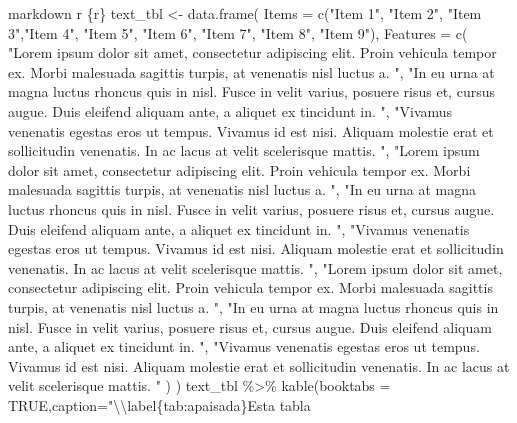 \documentclass[11pt,a4paper,oneside,]{article}
\newenvironment{Shaded}{\begin{snugshade}}{\end{snugshade}}
\newcommand{\AttributeTok}[1]{\textcolor[rgb]{0.77,0.63,0.00}{#1}}
\newcommand{\NormalTok}[1]{#1}
\newcommand{\SpecialCharTok}[1]{\textcolor[rgb]{0.00,0.00,0.00}{#1}}
\newcommand{\StringTok}[1]{\textcolor[rgb]{0.31,0.60,0.02}{#1}}
\numberwithin{dummy}{section}
\theoremstyle{ocrenumbox}
\theoremstyle{blacknumex}
\theoremstyle{blacknumbox}
\theoremstyle{ocrenum}
\theoremstyle{ocrenum}
\begin{document}
\begin{Shaded}
\begin{Highlighting}[numbers=left,,]
\StringTok{\textasciigrave{}\textasciigrave{}\textasciigrave{}\textasciigrave{}}\NormalTok{markdown}
\StringTok{\textasciigrave{}}\AttributeTok{r \textquotesingle{}\textquotesingle{}}\StringTok{\textasciigrave{}\textasciigrave{}\textasciigrave{}\textasciigrave{}}\AttributeTok{\{r\}}
\AttributeTok{text\_tbl \textless{}{-} data.frame(}
\AttributeTok{  Items = c("Item 1", "Item 2", "Item 3","Item 4", "Item 5", "Item 6",}
\AttributeTok{    "Item 7", "Item 8", "Item 9"), }
\AttributeTok{  Features = c(}
\AttributeTok{    "Lorem ipsum dolor sit amet, consectetur adipiscing elit.}
\AttributeTok{    Proin vehicula tempor ex. Morbi malesuada sagittis turpis,}
\AttributeTok{    at venenatis nisl luctus a. ",}
\AttributeTok{    "In eu urna at magna luctus rhoncus quis in nisl. Fusce in velit}
\AttributeTok{    varius, posuere risus et, cursus augue. Duis eleifend aliquam ante,}
\AttributeTok{    a aliquet ex tincidunt in. ",}
\AttributeTok{    "Vivamus venenatis egestas eros ut tempus. Vivamus id est nisi.}
\AttributeTok{    Aliquam molestie erat et sollicitudin venenatis. In ac lacus at}
\AttributeTok{    velit scelerisque mattis. ",}
\AttributeTok{    "Lorem ipsum dolor sit amet, consectetur adipiscing elit.}
\AttributeTok{    Proin vehicula tempor ex. Morbi malesuada sagittis turpis,}
\AttributeTok{    at venenatis nisl luctus a. ",}
\AttributeTok{    "In eu urna at magna luctus rhoncus quis in nisl. Fusce in velit}
\AttributeTok{    varius, posuere risus et, cursus augue. Duis eleifend aliquam ante,}
\AttributeTok{    a aliquet ex tincidunt in. ",}
\AttributeTok{    "Vivamus venenatis egestas eros ut tempus. Vivamus id est nisi.}
\AttributeTok{    Aliquam molestie erat et sollicitudin venenatis. In ac lacus at}
\AttributeTok{    velit scelerisque mattis. ",}
\AttributeTok{    "Lorem ipsum dolor sit amet, consectetur adipiscing elit.}
\AttributeTok{    Proin vehicula tempor ex. Morbi malesuada sagittis turpis,}
\AttributeTok{    at venenatis nisl luctus a. ",}
\AttributeTok{    "In eu urna at magna luctus rhoncus quis in nisl. Fusce in velit}
\AttributeTok{    varius, posuere risus et, cursus augue. Duis eleifend aliquam ante,}
\AttributeTok{    a aliquet ex tincidunt in. ",}
\AttributeTok{    "Vivamus venenatis egestas eros ut tempus. Vivamus id est nisi.}
\AttributeTok{    Aliquam molestie erat et sollicitudin venenatis. In ac lacus at}
\AttributeTok{    velit scelerisque mattis. "}
\AttributeTok{    ) }
\AttributeTok{  )}
\AttributeTok{text\_tbl \%\textgreater{}\%}
\AttributeTok{  kable(booktabs = TRUE,caption="}\SpecialCharTok{\textbackslash{}\textbackslash{}}\AttributeTok{label\{tab:apaisada\}Esta tabla }

\end{Highlighting}
\end{Shaded}
\end{document}
